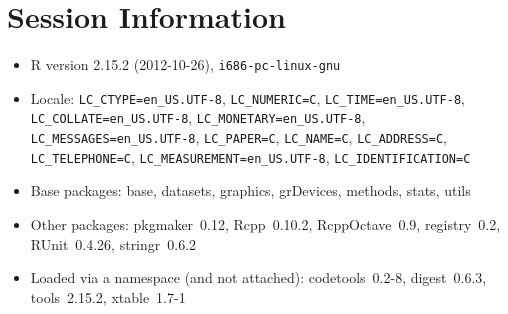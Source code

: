\documentclass[10pt]{article}
\begin{document}
\section*{Session Information}
\begin{itemize}\raggedright
  \item R version 2.15.2 (2012-10-26), \verb|i686-pc-linux-gnu|
  \item Locale: \verb|LC_CTYPE=en_US.UTF-8|, \verb|LC_NUMERIC=C|, \verb|LC_TIME=en_US.UTF-8|, \verb|LC_COLLATE=en_US.UTF-8|, \verb|LC_MONETARY=en_US.UTF-8|, \verb|LC_MESSAGES=en_US.UTF-8|, \verb|LC_PAPER=C|, \verb|LC_NAME=C|, \verb|LC_ADDRESS=C|, \verb|LC_TELEPHONE=C|, \verb|LC_MEASUREMENT=en_US.UTF-8|, \verb|LC_IDENTIFICATION=C|
  \item Base packages: base, datasets, graphics, grDevices, methods,
    stats, utils
  \item Other packages: pkgmaker~0.12, Rcpp~0.10.2, RcppOctave~0.9,
    registry~0.2, RUnit~0.4.26, stringr~0.6.2
  \item Loaded via a namespace (and not attached): codetools~0.2-8,
    digest~0.6.3, tools~2.15.2, xtable~1.7-1
\end{itemize}
\end{document}
